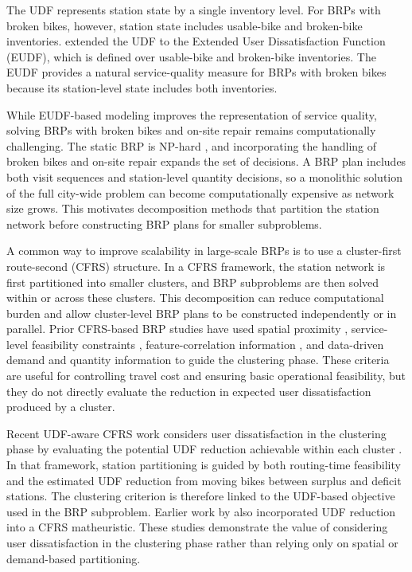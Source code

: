 The UDF represents station state by a single inventory level. For BRPs with
broken bikes, however, station state includes usable-bike and broken-bike
inventories. \citet{kaspiBikesharingSystemsUser2017} extended the UDF to the
Extended User Dissatisfaction Function (EUDF), which is defined over
usable-bike and broken-bike inventories. The EUDF provides a natural
service-quality measure for BRPs with broken bikes because its station-level
state includes both inventories.

While EUDF-based modeling improves the representation of service quality,
solving BRPs with broken bikes and on-site repair remains computationally
challenging. The static BRP is NP-hard
\citep{benchimolBalancingStationsSelf2011}, and incorporating the handling of
broken bikes and on-site repair expands the set of decisions. A BRP plan
includes both visit sequences and station-level quantity decisions, so a
monolithic solution of the full city-wide problem can become computationally
expensive as network size grows. This motivates decomposition methods that
partition the station network before constructing BRP plans for smaller
subproblems.

A common way to improve scalability in large-scale BRPs is to use a
cluster-first route-second (CFRS) structure. In a CFRS framework, the station
network is first partitioned into smaller clusters, and BRP subproblems are
then solved within or across these clusters. This decomposition can reduce
computational burden and allow cluster-level BRP plans to be constructed
independently or in parallel. Prior CFRS-based BRP studies have used spatial
proximity \citep{huangStaticBikeRepositioning2020,lvHybridAlgorithmStatic2020},
service-level feasibility constraints
\citep{schuijbroekInventoryRebalancingVehicle2017}, feature-correlation
information \citep{lvFeatureCorrelationReinforce2024}, and data-driven demand
and quantity information \citep{liuDataDrivenOptimizationFramework2025} to
guide the clustering phase. These criteria are useful for controlling travel
cost and ensuring basic operational feasibility, but they do not directly
evaluate the reduction in expected user dissatisfaction produced by a cluster.

Recent UDF-aware CFRS work considers user dissatisfaction in the clustering
phase by evaluating the potential UDF reduction achievable within each cluster
\citep{hu2026userdissatisfactionaware}. In that framework, station
partitioning is guided by both routing-time feasibility and the estimated UDF
reduction from moving bikes between surplus and deficit stations. The
clustering criterion is therefore linked to the UDF-based objective used in the
BRP subproblem. Earlier work by \citet{forma3stepMathHeuristic2015} also
incorporated UDF reduction into a CFRS matheuristic. These studies demonstrate
the value of considering user dissatisfaction in the clustering phase rather
than relying only on spatial or demand-based partitioning.

